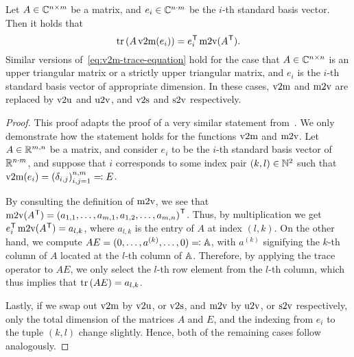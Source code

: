 \begin{lemma}\label{lem:v2m-function-trace}
    Let $A \in \mathbb{C}^{n \times m}$ be a matrix, and $e_i \in \mathbb{C}^{n \cdot m}$ be the $i$-th standard basis vector.
    Then it holds that
    \begin{equation}\label{eq:v2m-trace-equation}
        \mathop{}\!\mathrm{tr}\left(A \mathop{}\!\mathrm{v}2\mathrm{m}(e_i)\right) = e_i^{\mkern1mu \mathsf{T}} \mathop{}\!\mathrm{m}2\mathrm{v}(A^{\mkern1mu \mathsf{T}}).
    \end{equation}
    Similar versions of~\eqref{eq:v2m-trace-equation} hold for the case that $A \in \mathbb{C}^{n \times n}$ is an upper triangular matrix or a strictly upper triangular matrix, and $e_i$ is the $i$-th standard basis vector of appropriate dimension.
    In these cases, $\mathop{}\!\mathrm{v}2\mathrm{m}$ and $\mathop{}\!\mathrm{m}2\mathrm{v}$ are replaced by $\mathop{}\!\mathrm{v}2\mathrm{u}$ and $\mathop{}\!\mathrm{u}2\mathrm{v}$, and $\mathop{}\!\mathrm{v}2\mathrm{s}$ and $\mathop{}\!\mathrm{s}2\mathrm{v}$ respectively.
\end{lemma}

\begin{proof}
    This proof adapts the proof of a very similar statement from~\cite[Lemma~3.4]{Schwerdtner2023}.
    We only demonstrate how the statement holds for the functions $\mathop{}\!\mathrm{v}2\mathrm{m}$ and $\mathop{}\!\mathrm{m}2\mathrm{v}$.
    Let $A \in \mathbb{R}^{m, n}$ be a matrix, and consider $e_i$ to be the $i$-th standard basis vector of $\mathbb{R}^{n \cdot m}$, and suppose that $i$ corresponds to some index pair $(k, l) \in \mathbb{N}^2$ such that $\mathop{}\!\mathrm{v}2\mathrm{m}(e_i) = {(\delta_{i, j})}_{i, j = 1}^{n, m} \eqqcolon E$.


    By consulting the definition of $\mathop{}\!\mathrm{m}2\mathrm{v}$, we see that $\mathop{}\!\mathrm{m}2\mathrm{v}(A^{\mkern1mu \mathsf{T}}) = {(a_{1, 1}, \dots, a_{m, 1}, a_{1, 2}, \dots, a_{m, n})}^{\mkern1mu \mathsf{T}}$.
    Thus, by multiplication we get $e_i^{\mkern1mu \mathsf{T}} \mathop{}\!\mathrm{m}2\mathrm{v}(A^{\mkern1mu \mathsf{T}}) = a_{l, k}$, where $a_{l, k}$ is the entry of $A$ at index $(l, k)$.
    On the other hand, we compute $A E = (0, \dots, a^{(k)}, \dots, 0) \eqqcolon \mathbb{A}$, with $a^{(k)}$ signifying the $k$-th column of $A$ located at the $l$-th column of $\mathbb{A}$.
    Therefore, by applying the trace operator to $A E$, we only select the $l$-th row element from the $l$-th column, which thus implies that $\mathop{}\!\mathrm{tr}\left(A E\right) = a_{l, k}$.

    Lastly, if we swap out $\mathop{}\!\mathrm{v}2\mathrm{m}$ by $\mathop{}\!\mathrm{v}2\mathrm{u}$, or $\mathop{}\!\mathrm{v}2\mathrm{s}$, and $\mathop{}\!\mathrm{m}2\mathrm{v}$ by $\mathop{}\!\mathrm{u}2\mathrm{v}$, or $\mathop{}\!\mathrm{s}2\mathrm{v}$ respectively, only the total dimension of the matrices $A$ and $E$, and the indexing from $e_i$ to the tuple $(k, l)$ change slightly.
    Hence, both of the remaining cases follow analogously.

\end{proof}

